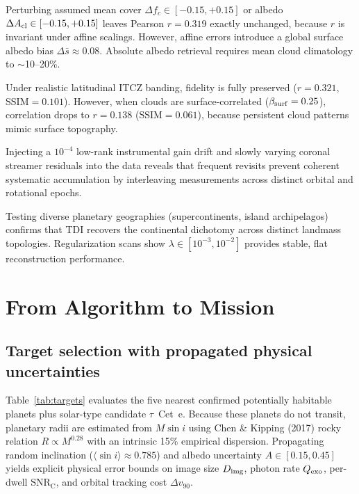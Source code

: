 \documentclass[twocolumn,10pt]{article}
\begin{document}
\vspace{1mm}
 Perturbing assumed mean cover
$\Delta f_c\in[-0.15,+0.15]$ or albedo $\Delta A_{\rm cl}\in[-0.15,+0.15]$
leaves Pearson $r=0.319$ exactly unchanged, because $r$ is invariant under
affine scalings. However, affine errors introduce a global surface albedo bias
$\Delta\bar{s}\approx0.08$. Absolute albedo retrieval requires mean cloud
climatology to $\sim$10--20\%.

\vspace{1mm}
 Under realistic latitudinal ITCZ banding,
fidelity is fully preserved ($r=0.321$, $\mathrm{SSIM}=0.101$). However, when
clouds are surface-correlated ($\beta_{\rm surf}=0.25$), correlation drops to
$r=0.138$ ($\mathrm{SSIM}=0.061$), because persistent cloud patterns mimic
surface topography.

\vspace{1mm}
 Injecting a $10^{-4}$
low-rank instrumental gain drift and slowly varying coronal streamer residuals
into the data reveals that frequent revisits prevent coherent systematic accumulation
by interleaving measurements across distinct orbital and rotational epochs.

\vspace{1mm}
 Testing diverse planetary
geographies (supercontinents, island archipelagos) confirms that TDI recovers
the continental dichotomy across distinct landmass topologies. Regularization
scans show $\lambda\in[10^{-3},10^{-2}]$ provides stable, flat reconstruction
performance.

\section{From Algorithm to Mission}
\label{sec:mission}

\subsection{Target selection with propagated physical uncertainties}
\label{sec:targets}

Table~\ref{tab:targets} evaluates the five nearest confirmed potentially
habitable planets plus solar-type candidate $\tau$~Cet~e.
Because these planets do not transit, planetary radii are estimated from
$M\sin i$ using Chen \& Kipping (2017) rocky relation $R\propto M^{0.28}$
with an intrinsic 15\% empirical dispersion. Propagating random inclination
($\langle\sin i\rangle\approx0.785$) and albedo uncertainty $A\in[0.15,0.45]$
yields explicit physical error bounds on image size $D_{\rm img}$, photon rate
$Q_{\rm exo}$, per-dwell $\mathrm{SNR_C}$, and orbital tracking cost $\Delta v_{90}$.
\end{document}
